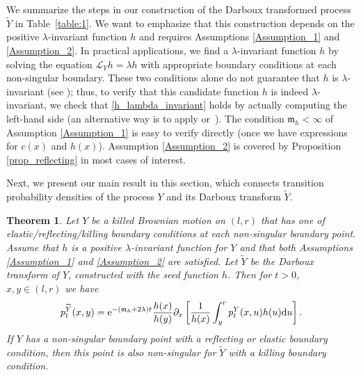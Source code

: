 \documentclass[pdftex]{sigma}
\numberwithin{equation}{section}
\newtheorem{Theorem}{Theorem}[section]
\theoremstyle{definition}
\def\L{{\mathcal L}}
\def\d{{\textnormal d}}
\begin{document}
We summarize the steps in our construction of the Darboux transformed process $\widetilde Y$ in Table~\ref{table:1}. We want to emphasize that this construction depends on the positive $\lambda$-invariant function $h$ and requires Assumptions
\ref{Assumption_1} and \ref{Assumption_2}.
In practical applications, we find a $\lambda$-invariant function $h$ by solving the equation $\L_Y h =\lambda h$ with appropriate boundary conditions at each non-singular boundary. These two conditions alone do not guarantee that $h$ is $\lambda$-invariant (see \cite{Rogers_2021, Mijatovic_2012}); thus, to verify that this candidate function $h$ is indeed $\lambda$-invariant, we check that \eqref{h_lambda_invariant} holds by actually computing the left-hand side (an alternative way is to apply \cite[Theorem 2.7]{Rogers_2021} or~\cite[Corollary 2.2]{Mijatovic_2012}). The condition ${\mathfrak m}_h< \infty$ of Assumption \ref{Assumption_1} is easy to verify directly (once we have expressions for $c(x)$ and $h(x)$). Assumption \ref{Assumption_2} is covered by Proposition \ref{prop_reflecting} in most cases of interest.

Next, we present our main result in this section, which connects transition probability densities of the process $Y$ and its Darboux transform $\widetilde Y$.

\begin{Theorem}\label{thm:main2} Let $Y$ be a killed Brownian motion on $(l,r)$ that has one of elastic/reflecting/kil\-l\-ing boundary conditions at each non-singular boundary point. Assume that $h$ is a positive $\lambda$-invariant function for $Y$ and that both Assumptions {\rm\ref{Assumption_1}} and
{\rm\ref{Assumption_2}} are satisfied. Let $\widetilde Y$ be the Darboux transform of $Y$, constructed with the seed function $h$. Then for $t>0$, $x,y\in (l,r)$ we have
\begin{equation}\label{equation_tilde_p}
 p^{\widetilde Y}_t(x,y)={\rm e}^{-({\mathfrak m}_h + 2\lambda) t}\frac{h(x)}{h(y)} \partial_{x}
\left[ \frac{1}{h(x)} \int_{y}^r p^{Y}_t(x,u) h(u) \d u \right].
\end{equation}
If $Y$ has a non-singular boundary point with a reflecting or elastic boundary condition, then this point is also non-singular for $\widetilde Y$ with a killing boundary condition.
\end{Theorem}
\end{document}
